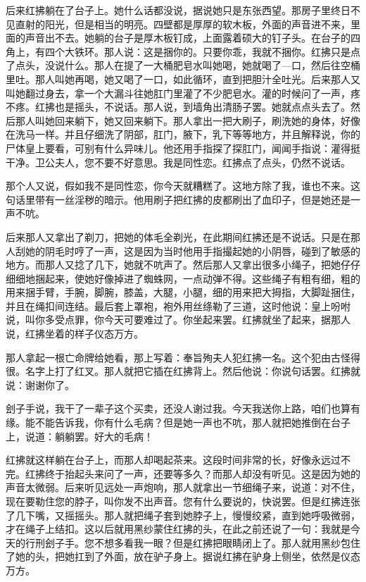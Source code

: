 后来红拂躺在了台子上。她什么话都没说，据说她只是东张西望。那房子里终日不见直射的阳光，但是相当的明亮。四壁都是厚厚的软木板，外面的声音进不来，里面的声音出不去。她躺的台子是厚木板钉成，上面露着硕大的钉子头。在台子的四角上，有四个大铁环。那人说：这是捆你的。只要你乖，我就不捆你。红拂只是点了点头，没说什么。那人在提了一大桶肥皂水叫她喝，她就喝了—口，然后往空桶里吐。那人叫她再喝，她又喝了一口，如此循环，直到把胆汁全吐光。后来那人又叫她翻过身去，拿一个大漏斗往她肛门里灌了不少肥皂水。灌的时候问了一声，疼不疼。红拂也是摇头，不说话。那人说，到墙角出清肠子罢。她就点点头去了。然后那人叫她回来躺下，她又回来躺下。那人拿出一把大刷子，刷洗她的身体，好像在洗马一样。并且仔细洗了阴部，肛门，腋下，乳下等等地方，并且解释说，你的尸体皇上要看，可别有什么异味儿。他还用手指探了探肛门，闻闻手指说：灌得挺干净。卫公夫人，您不要不好意思。我是同性恋。红拂点了点头，仍然不说话。 

那个人又说，假如我不是同性恋，你今天就糟糕了。这地方除了我，谁也不来。这句话里带有一丝淫秽的暗示。他用刷子把红拂的皮都刷出了血印子，但是她还是一声不吭。 

后来那人又拿出了剃刀，把她的体毛全剃光，在此期间红拂还是不说话。只是在那人刮她的阴毛时哼了一声，这是因为当时他用手指撮起她的小阴唇，碰到了敏感的地方。而那人又捻了几下，她就不吭声了。然后那人又拿出很多小绳子，把她仔仔细细地捆起来，使她好像掉进了蜘蛛网，一点动弹不得。这些绳子有粗有细，粗的用来捆手臂，手腕，脚腕，膝盖，大腿，小腿，细的用来把大拇指，大脚趾捆住，并且在绳扣间连结。最后套上罩袍，袍外用丝绦勒了三道，这时他说：皇上吩咐说，叫你多受点罪，你今天可要难过了。你坐起来罢。红拂就坐了起来，据那人说，红拂坐着的样子仪态万方。 

那人拿起一根亡命牌给她看，那上写着：奉旨殉夫人犯红拂一名。这个犯由古怪得很。名字上打了红叉。那人就把它插在红拂背上。然后他说：你说句话罢。红拂就说：谢谢你了。 

刽子手说，我干了一辈子这个买卖，还没人谢过我。今天我送你上路，咱们也算有缘。能不能告诉我，你有什么毛病？但是她一声也不吭，那人就把她推倒在台子上，说道：躺躺罢。好大的毛病！ 

红拂就这样躺在台子上，而那人却喝起茶来。这段时间非常的长，好像永远过不完。红拂终于抬起头来问了一声，还要等多久？而那人却没有听见。这是因为她的声音太微弱。后来听见远处一声炮响，那人就拿出一节细绳子来，说道：对不住，现在要勒住您的脖子，叫你发不出声音。您有什么要说的，快说罢。但是红拂连张了几下嘴，又摇摇头。那人就把绳子套到她脖子上，慢慢绞紧，直到她呼吸微弱，才在绳子上结扣。这以后就用黑纱蒙住红拂的头，在此之前还说了一句：我就是今天的行刑刽子手。您不想多看我一眼？但是红拂把眼睛闭上了。那人就用黑纱包住了她的头，把她扛到了外面，放在驴子身上。据说红拂在驴身上侧坐，依然是仪态万方。 


